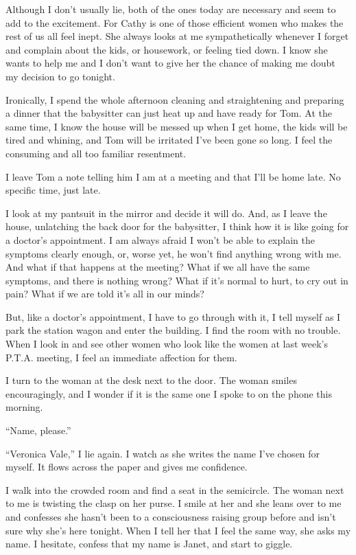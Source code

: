 \documentclass[
]{article}
\begin{document}
Although I don't usually lie, both of the ones today are necessary and
seem to add to the excitement. For Cathy is one of those efficient women
who makes the rest of us all feel inept. She always looks at me
sympathetically whenever I forget and complain about the kids, or
housework, or feeling tied down. I know she wants to help me and I don't
want to give her the chance of making me doubt my decision to go
tonight.

Ironically, I spend the whole afternoon cleaning and straightening and
preparing a dinner that the babysitter can just heat up and have ready
for Tom. At the same time, I know the house will be messed up when I get
home, the kids will be tired and whining, and Tom will be irritated I've
been gone so long. I feel the consuming and all too familiar resentment.

I leave Tom a note telling him I am at a meeting and that I'll be home
late. No specific time, just late.

I look at my pantsuit in the mirror and decide it will do. And, as I
leave the house, unlatching the back door for the babysitter, I think
how it is like going for a doctor's appointment. I am always afraid I
won't be able to explain the symptoms clearly enough, or, worse yet, he
won't find anything wrong with me. And what if that happens at the
meeting? What if we all have the same symptoms, and there is nothing
wrong? What if it's normal to hurt, to cry out in pain? What if we are
told it's all in our minds?

But, like a doctor's appointment, I have to go through with it, I tell
myself as I park the station wagon and enter the building. I find the
room with no trouble. When I look in and see other women who look like
the women at last week's P.T.A. meeting, I feel an immediate affection
for them.

I turn to the woman at the desk next to the door. The woman smiles
encouragingly, and I wonder if it is the same one I spoke to on the
phone this morning.

``Name, please.''

``Veronica Vale,'' I lie again. I watch as she writes the name I've
chosen for myself. It flows across the paper and gives me confidence.

I walk into the crowded room and find a seat in the semicircle. The
woman next to me is twist­ing the clasp on her purse. I smile at her and
she leans over to me and confesses she hasn't been to a consciousness
raising group before and isn't sure why she's here tonight. When I tell
her that I feel the same way, she asks my name. I hesitate, confess that
my name is Janet, and start to giggle.
\end{document}
